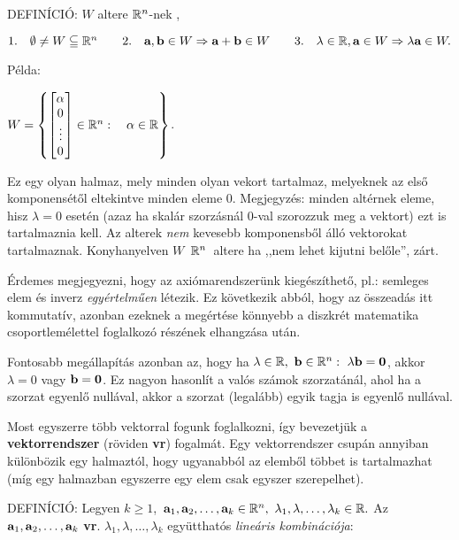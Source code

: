 \documentclass[a4paper,11.5pt]{article}
\begin{document}
	 DEFINÍCIÓ: $W$ { altere} $\mathbb{R}^{n}${-nek} ,  
	
	\noindent $\text{1.}\quad  \emptyset\not= W\subseteqq  \mathbb{R}^{n}  \qquad 
	\text{2.}\quad \textbf{a} ,\textbf{b} \in W \Rightarrow \textbf{a} +\textbf{b} \in W \qquad 
	\text{3.}\quad \lambda \in  \mathbb{R} , \textbf{a} \in W \Rightarrow \lambda \textbf{a} \in W .$ 
	
	\medskip
	\noindent Példa:
	
	{\centering 
		$W=\left\{
	\begin{bmatrix}
		\alpha\s\\
		0\s\\
		\vdots \\
		0\s\\
	\end{bmatrix} \in \Rn: \quad \alpha\in \R \right\}$.
	\par}
	
	\noindent Ez egy olyan halmaz, mely minden olyan vekort tartalmaz, melyeknek az első komponensétől eltekintve minden eleme 0. 
	Megjegyzés: \0 minden altérnek eleme, hisz $\lambda=0$ esetén (azaz ha skalár szorzásnál 0-val szorozzuk meg a vektort) ezt is tartalmaznia kell. Az alterek \emph{nem} kevesebb komponensből álló vektorokat tartalmaznak. Konyhanyelven $W$~$\mathbb{R}^{n}$~altere ha ,,nem lehet kijutni belőle'', zárt.
	
	Érdemes megjegyezni, hogy az axiómarendszerünk kiegészíthető, pl.: semleges elem és inverz \emph{egyértelműen} létezik. Ez következik abból, hogy az összeadás itt kommutatív, azonban ezeknek a megértése könnyebb a diszkrét matematika csoportlemélettel foglalkozó részének elhangzása után.
	
	Fontosabb megállapítás azonban az, hogy ha $\lambda \in \mathbb{R},~\textbf{b} \in \mathbb{R}^{n}: ~\lambda\textbf{b}=\textbf{0}$, akkor $\lambda=0$ vagy $\textbf{b}=\textbf{0}$. Ez nagyon hasonlít a valós számok szorzatánál, ahol ha a szorzat egyenlő nullával, akkor a szorzat (legalább) egyik tagja is egyenlő nullával.
	
	Most egyszerre több vektorral fogunk foglalkozni, így bevezetjük a \textbf{vektorrendszer} (röviden \textbf{vr}) fogalmát. Egy vektorrendszer csupán annyiban különbözik egy halmaztól, hogy ugyanabból az elemből többet is tartalmazhat (míg egy halmazban egyszerre egy elem csak egyszer szerepelhet).
	
	DEFINÍCIÓ: Legyen $k\ge1$,~$\textbf{a}_1, \textbf{a}_2, \ldots , \textbf{a}_k \in \mathbb{R}^{n},~ \lambda_1, \lambda, \ldots , \lambda_k \in \mathbb{R}.$ Az $\textbf{a}_1, \textbf{a}_2, \ldots , \textbf{a}_k$ \textbf{vr}. $\lambda_1, \lambda, \ldots , \lambda_k$ együtthatós \emph{lineáris kombinációja}:
	
\end{document}
